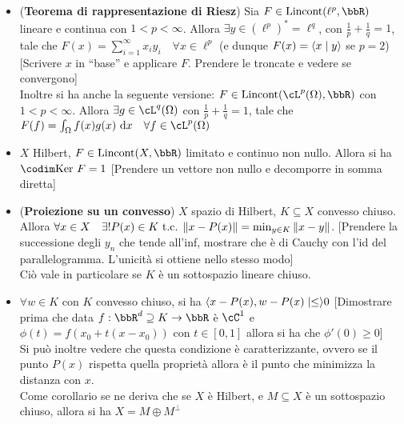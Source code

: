 \documentclass[a4paper,NoNotes,GeneralMath]{stdmdoc}
\newcommand{\cl}{\ell}
\newcommand{\Lincont}{\text{Lincont}}
\begin{document}
\begin{itemize}
        \item ({\bf Teorema di rappresentazione di Riesz}) Sia $F \in \Lincont(\cl^p, \bbR)$ lineare e continua con $1 < p < \infty$. Allora $\exists y \in (\cl^p)^* = \cl^q$, con $\frac{1}{p} + \frac{1}{q} = 1$, tale che $F(x) = \sum_{i=1}^\infty x_i y_i \quad \forall x \in \cl^p$ (e dunque $F(x) = \langle x \mid y \rangle$ se $p = 2$) [Scrivere $x$ in ``base'' e applicare $F$. Prendere le troncate e vedere se convergono] \\
          Inoltre si ha anche la seguente versione: $F \in \Lincont(\cL^p(\Omega), \bbR)$ con $1 < p < \infty$. Allora $\exists g \in \cL^q(\Omega)$ con $\frac{1}{p} + \frac{1}{q} = 1$, tale che $F(f) = \int_\Omega f(x) g(x) \de x \quad \forall f \in \cL^p(\Omega)$
        \item $X$ Hilbert, $F \in \Lincont(X, \bbR)$ limitato e continuo non nullo. Allora si ha $\codim \Ker F = 1$ [Prendere un vettore non nullo e decomporre in somma diretta]
        \item ({\bf Proiezione su un convesso}) $X$ spazio di Hilbert, $K \subseteq X$ convesso chiuso. Allora $\forall x \in X \quad \exists ! P(x) \in K \mbox{ t.c. } \| {x - P(x)} \| = \min_{y \in K} \| {x - y} \|$. [Prendere la successione degli $y_n$ che tende all'inf, mostrare che è di Cauchy con l'id del parallelogramma. L'unicità si ottiene nello stesso modo] \\
          Ciò vale in particolare se $K$ è un sottospazio lineare chiuso.
        \item $\forall w \in K$ con $K$ convesso chiuso, si ha $\langle x - P(x), w - P(x) \mid \le \rangle 0$ [Dimostrare prima che data $f: \bbR^d \supseteq K \rar \bbR$ è $\cC^1$ e $\phi(t) = f(x_0 + t (x - x_0))$ con $t \in [0, 1]$ allora si ha che $\phi '(0) \ge 0$] \\
          Si può inoltre vedere che questa condizione è caratterizzante, ovvero se il punto $P(x)$ rispetta quella proprietà allora è il punto che minimizza la distanza con $x$. \\
          Come corollario se ne deriva che se $X$ è Hilbert, e $M \subseteq X$ è un sottospazio chiuso, allora si ha $X = M \oplus M^\bot$
          
        \end{itemize}
        
\end{document}
